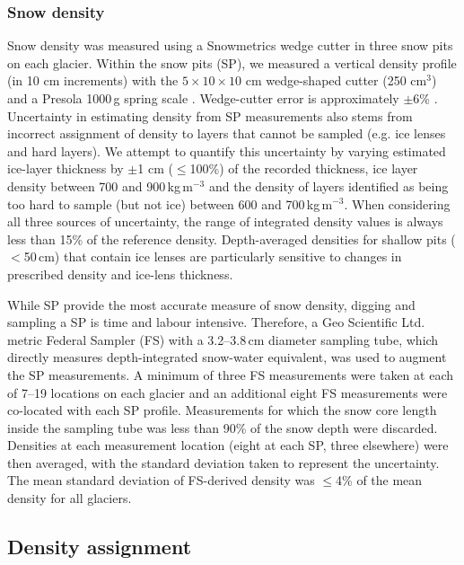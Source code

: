\documentclass[twocolumn, letterpaper]{igs}
\begin{document}
\subsubsection{Snow density}

Snow density was measured using a Snowmetrics wedge cutter in three snow pits on each glacier. Within the snow pits (SP), we measured a vertical density profile (in 10 cm increments) with the $5\times10\times 10$ cm wedge-shaped cutter (250 cm$^3$) and a Presola 1000\,g spring scale \citep[e.g.][]{Gray1981,Fierz2009,Kinar2015}. Wedge-cutter error is approximately $\pm$6\% \citep[e.g.][]{Proksch2016,Carroll1977}. Uncertainty in estimating density from SP measurements also stems from incorrect assignment of density to layers that cannot be sampled (e.g. ice lenses and hard layers). We attempt to quantify this uncertainty by varying estimated ice-layer thickness by $\pm$1 cm ($\leq$100\%) of the recorded thickness, ice layer density between 700 and 900\,kg\,m$^{-3}$ and the density of layers identified as being too hard to sample (but not ice) between 600 and 700\,kg\,m$^{-3}$. When considering all three sources of uncertainty, the range of integrated density values is always less than 15\% of the reference density. Depth-averaged densities for shallow pits ($<$50\,cm) that contain ice lenses are particularly sensitive to changes in prescribed density and ice-lens thickness. 

While SP provide the most accurate measure of snow density, digging and sampling a SP is time and labour intensive. Therefore, a Geo Scientific Ltd. metric Federal Sampler (FS) \citep{Clyde1932} with a 3.2--3.8\,cm diameter sampling tube, which directly measures depth-integrated snow-water equivalent, was used to augment the SP measurements. A minimum of three FS measurements were taken at each of 7--19 locations on each glacier and an additional eight FS measurements were co-located with each SP profile. Measurements for which the snow core length inside the sampling tube was less than 90\% of the snow depth were discarded. Densities at each measurement location (eight at each SP, three elsewhere) were then averaged, with the standard deviation taken to represent the uncertainty. The mean standard deviation of FS-derived density was $\leq$4\% of the mean density for all glaciers.

\subsection{Density assignment}
\end{document}
